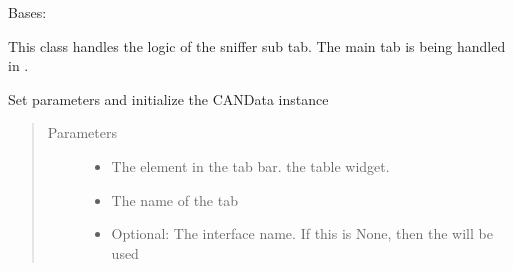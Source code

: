 \documentclass[letterpaper,10pt,english]{sphinxmanual}
\begin{document}
\begin{fulllineitems}
\label{\detokenize{src:src.SnifferTabElement.SnifferTabElement}}
Bases: {\hyperref[\detokenize{src:src.AbstractTab.AbstractTab}]{}}

This class handles the logic of the sniffer sub tab.
The main tab is being handled in {\hyperref[\detokenize{src:src.SnifferTab.SnifferTab}]{}}.

\begin{fulllineitems}
\label{\detokenize{src:src.SnifferTabElement.SnifferTabElement.__init__}}
Set parameters and initialize the CANData instance
\begin{quote}\begin{description}
\item[{Parameters}] \leavevmode\begin{itemize}
\item {} 
 \textendash{} The element in the tab bar.  the table widget.

\item {} 
 \textendash{} The name of the tab

\item {} 
 \textendash{} Optional: The interface name. If this is None, then the  will be used

\end{itemize}

\end{description}\end{quote}

\end{fulllineitems}



\end{fulllineitems}
\end{document}
